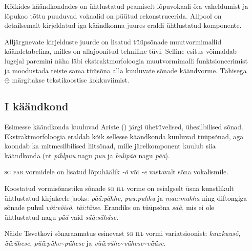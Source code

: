 \documentclass[12pt,a4paper]{article}
\newcommand{\vadja}[1]{\textit{#1}}
\newcommand{\msd}[1]{\textsc{#1}}
\begin{document}


Kõikides käändkondades on ühtlustatud peamiselt lõpuvokaali õ:a vaheldumist ja lõpukao tõttu puuduvad vokaalid on püütud rekonstrueerida. Allpool on detailsemalt kirjeldatud iga käändkonna juures eraldi ühtlustatud komponente.


% 
Alljärgnevate kirjelduste juurde on lisatud tüüpsõnade muutvormimallid käände\-tabelina, milles on alla\-joonitud tehniline tüvi. Selline esitus võimaldab lugejal paremini näha läbi ekstrakt\-morfoloogia muutvormimalli funktsioneerimist ja moodustada teiste sama tüüsõna alla kuuluvate sõnade käändvorme. Tähisega $\oplus$ märgitakse teksti\-koostise kokku\-viimist.

\subsection{\RN{1} käändkond}

Esimesse käändkonda kuuluvad Ariste (\citeyear[40]{ariste_grammar_1968}) järgi ühetüvelised, ühesilbilised sõnad. Ekstraktmorfoloogia eraldab kõik sellesse käändkonda kuuluvad tüüpsõnad, aga koondab ka mitmesilbilised liitsõnad, mille järelkomponent kuulub siia käändkonda (nt \vadja{pihlpuu} nagu \vadja{puu} ja \vadja{bulipää} nagu \vadja{pää}).

\msd{sg par} vormidele on lisatud lõpuhäälik \textit{-õ} või \textit{-e} vastavalt sõna vokalismile.

Koostatud vormisõnastiku sõnade \msd{sg ill} vorme on esialgselt üsna kunstlikult ühtlustatud kirjakeele jaoks: \textit{pää:pähhe}, \textit{puu:puhhu} ja \textit{maa:mahha} ning diftongiga sõnade puhul \textit{või:võisõ}, \textit{täi:täise}. Erandiks on tüüpsõna \textit{sää}, mis ei ole ühtlustatud nagu \textit{pää} vaid \textit{sää:sähäse}.

Näide Tsvetkovi sõnaraamatus esinevast \msd{sg ill} vormi variatsioonist: \vadja{kuu}:\vadja{kuusõ}, \vadja{üü}:\vadja{ühese}, \vadja{püü}:\vadja{pühe}\textasciitilde \vadja{pühese} ja \vadja{vüü}:\vadja{vühe}\textasciitilde \vadja{vühese}\textasciitilde \vadja{vüüse}.
\end{document}
